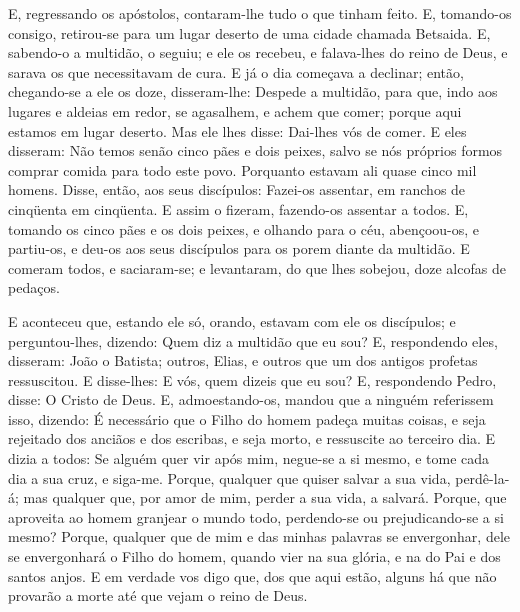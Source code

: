 E, regressando os apóstolos, contaram-lhe tudo o que tinham
feito. E, tomando-os consigo, retirou-se para um lugar deserto de
uma cidade chamada Betsaida. E, sabendo-o a multidão, o
seguiu; e ele os recebeu, e falava-lhes do reino de Deus, e sarava
os que necessitavam de cura. E já o dia começava a declinar;
então, chegando-se a ele os doze, disseram-lhe: Despede a multidão,
para que, indo aos lugares e aldeias em redor, se agasalhem, e achem
que comer; porque aqui estamos em lugar deserto. Mas ele lhes
disse: Dai-lhes vós de comer. E eles disseram: Não temos senão cinco
pães e dois peixes, salvo se nós próprios formos comprar comida para
todo este povo. Porquanto estavam ali quase cinco mil homens.
Disse, então, aos seus discípulos: Fazei-os assentar, em ranchos de
cinqüenta em cinqüenta. E assim o fizeram, fazendo-os
assentar a todos. E, tomando os cinco pães e os dois peixes,
e olhando para o céu, abençoou-os, e partiu-os, e deu-os aos seus
discípulos para os porem diante da multidão. E comeram todos,
e saciaram-se; e levantaram, do que lhes sobejou, doze alcofas de
pedaços.

E aconteceu que, estando ele só, orando, estavam com ele os
discípulos; e perguntou-lhes, dizendo: Quem diz a multidão que eu
sou? E, respondendo eles, disseram: João o Batista; outros,
Elias, e outros que um dos antigos profetas ressuscitou. E
disse-lhes: E vós, quem dizeis que eu sou? E, respondendo Pedro,
disse: O Cristo de Deus. E, admoestando-os, mandou que a
ninguém referissem isso, dizendo: É necessário que o Filho do
homem padeça muitas coisas, e seja rejeitado dos anciãos e dos
escribas, e seja morto, e ressuscite ao terceiro dia. E dizia
a todos: Se alguém quer vir após mim, negue-se a si mesmo, e tome
cada dia a sua cruz, e siga-me. Porque, qualquer que quiser
salvar a sua vida, perdê-la-á; mas qualquer que, por amor de mim,
perder a sua vida, a salvará. Porque, que aproveita ao homem
granjear o mundo todo, perdendo-se ou prejudicando-se a si mesmo?
Porque, qualquer que de mim e das minhas palavras se
envergonhar, dele se envergonhará o Filho do homem, quando vier na
sua glória, e na do Pai e dos santos anjos. E em verdade vos
digo que, dos que aqui estão, alguns há que não provarão a morte até
que vejam o reino de Deus.

